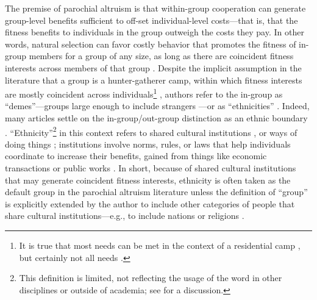 \documentclass[bibauthoryear]{aa}
\begin{document}
 The premise of parochial altruism is that within-group cooperation can generate group-level benefits sufficient to off-set individual-level costs---that is, that the fitness benefits to individuals in the group outweigh the costs they pay. %
	In other words, natural selection can favor costly behavior that promotes the fitness of in-group members for a group of any size, as long as there are coincident fitness interests across members of that group \citep{richerson2008not}. Despite the implicit assumption in the literature that a group is a hunter-gatherer camp, within which fitness interests are mostly coincident across individuals\footnote{It is true that most needs can be met in the context of a residential camp \citep[e.g.,][]{fafchamps2007formation}, but certainly not all needs \citep{hill2014hunter, layton2012antiquity}.} %
 \citep{bowles2003origins}, authors refer to the in-group as ``demes''---groups large enough to include strangers \citep[see][for a discussion]{brewer2006evolutionary}---or as ``ethnicities'' \citep{choi2007coevolution}. Indeed, many articles settle on the in-group/out-group distinction as an ethnic boundary \citep{mcelreath2003shared}. ``Ethnicity''\footnote{This definition is limited, not reflecting the usage of the word in other disciplines or outside of academia; see \citep{jenkins1994rethinking} for a discussion.} in this context refers to shared cultural institutions \citep{barth1956ecologic, barth1998ethnic}, or ways of doing things \citep{north1991}; institutions involve norms, rules, or laws that help individuals coordinate to increase their benefits, gained from things like economic transactions or public works \citep{glowacki2020}. In short, because of shared cultural institutions that may generate coincident fitness interests, ethnicity is often taken as the default group in the parochial altruism literature unless the definition of ``group'' is explicitly extended by the author to include other categories of people that share cultural institutions---e.g., to include nations \citep{greene2013moral} or religions \citep{purzycki2016moralistic}.
	
\end{document}

